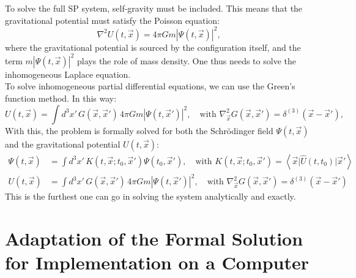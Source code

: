 \documentclass[12pt]{article}
\newcommand{\braket}[2]{\left< #1 | #2 \right>}
\begin{document}
To solve the full SP system, self-gravity must be included. This means that the gravitational potential must satisfy the Poisson equation:
\begin{equation}
    \nabla^2 U(t,\vec{x}) = 4\pi G m |\Psi(t,\vec{x})|^2,
\end{equation}
where the gravitational potential is sourced by the configuration itself, and the term \( m|\Psi(t,\vec{x})|^2 \) plays the role of mass density. One thus needs to solve the inhomogeneous Laplace equation.\\
To solve inhomogeneous partial differential equations, we can use the Green's function method. In this way:
\begin{equation}
    U(t,\vec{x}) = \int d^3 x' \, G(\vec{x},\vec{x}') \, 4\pi G m |\Psi(t,\vec{x}')|^2, \quad \text{with } \nabla^2_{\vec{x}} G(\vec{x},\vec{x}') = \delta^{(3)}(\vec{x} - \vec{x}'),
\end{equation}
With this, the problem is formally solved for both the Schrödinger field \( \Psi(t,\vec{x}) \) and the gravitational potential \( U(t,\vec{x}) \):
\begin{align}
    \Psi(t,\vec{x}) &= \int d^3 x' \, K(t,\vec{x}; t_0,\vec{x}') \Psi(t_0,\vec{x}'), \quad \text{with } K(t,\vec{x}; t_0,\vec{x}') = \braket{\vec{x}}{\hat{U}(t,t_0) \big| \vec{x}'} \label{eqn:PsiSP} \\
    U(t,\vec{x}) &= \int d^3 x' \, G(\vec{x},\vec{x}') \, 4\pi G m |\Psi(t,\vec{x}')|^2, \quad \text{with } \nabla^2_{\vec{x}} G(\vec{x},\vec{x}') = \delta^{(3)}(\vec{x} - \vec{x}') \label{eqn:USP}
\end{align}
This is the furthest one can go in solving the system analytically and exactly.

\section*{Adaptation of the Formal Solution for Implementation on a Computer}
\end{document}
